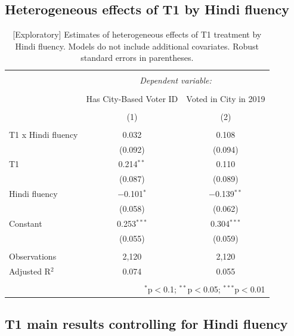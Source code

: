 \documentclass[
  11.5pt,
]{article}
\begin{document}
\clearpage

\hypertarget{heterogeneous-effects-of-t1-by-hindi-fluency}{%
\subsection{Heterogeneous effects of T1 by Hindi
fluency}\label{heterogeneous-effects-of-t1-by-hindi-fluency}}

\begin{table}[!htbp] \centering 
  \caption{[Exploratory] Estimates of heterogeneous effects of T1 treatment by Hindi fluency. Models do not include additional covariates. Robust standard errors in parentheses.} 
  \label{} 
\small 
\begin{tabular}{@{\extracolsep{5pt}}lcc} 
\\[-1.8ex]\hline 
\hline \\[-1.8ex] 
 & \multicolumn{2}{c}{\textit{Dependent variable:}} \\ 
\cline{2-3} 
\\[-1.8ex] & Has City-Based Voter ID & Voted in City in 2019 \\ 
\\[-1.8ex] & (1) & (2)\\ 
\hline \\[-1.8ex] 
 T1 x Hindi fluency & 0.032 & 0.108 \\ 
  & (0.092) & (0.094) \\ 
  T1 & 0.214$^{**}$ & 0.110 \\ 
  & (0.087) & (0.089) \\ 
  Hindi fluency & $-$0.101$^{*}$ & $-$0.139$^{**}$ \\ 
  & (0.058) & (0.062) \\ 
  Constant & 0.253$^{***}$ & 0.304$^{***}$ \\ 
  & (0.055) & (0.059) \\ 
 \hline \\[-1.8ex] 
Observations & 2,120 & 2,120 \\ 
Adjusted R$^{2}$ & 0.074 & 0.055 \\ 
\hline 
\hline \\[-1.8ex] 
\multicolumn{3}{r}{$^{*}$p$<$0.1; $^{**}$p$<$0.05; $^{***}$p$<$0.01} \\ 
\end{tabular} 
\end{table}

\clearpage

\hypertarget{t1-main-results-controlling-for-hindi-fluency}{%
\subsection{T1 main results controlling for Hindi
fluency}\label{t1-main-results-controlling-for-hindi-fluency}}
\end{document}
